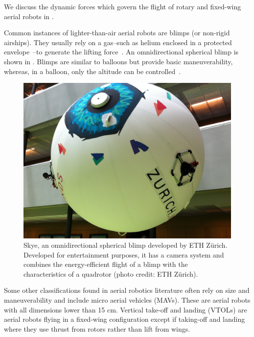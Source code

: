 We discuss the dynamic forces which govern the flight of rotary and fixed-wing aerial robots in .

Common instances of lighter-than-air aerial robots are blimps (or non-rigid airships). They usually rely on a gas--such as helium enclosed in a protected envelope~\citep{burri2013design}--to generate the lifting force~\citep{fui2017recent}. An omnidirectional spherical blimp is shown in . Blimps are similar to balloons but provide basic maneuverability, whereas, in a balloon, only the altitude can be controlled~\citep{colombatti2011lighter}.

\begin{figure}[h]
  \centering
  \includegraphics[width=.7\textwidth]{pictures/IMG_2612}
  \caption[Skye, an omnidirectional spherical blimp]{Skye, an omnidirectional spherical blimp developed by ETH Z\"urich. Developed for entertainment purposes, it has a camera system and combines the energy-efficient flight of a blimp with the characteristics of a quadrotor {\scriptsize(photo credit: ETH Z\"urich)}.}   
  \label{fig:skye-blimp}
\end{figure}

Some other classifications found in aerial robotics literature often rely on size and maneuverability and include micro aerial vehicles (MAVs). These are aerial robots with all dimensions lower than 15 cm. Vertical take-off and landing (VTOLs) are aerial robots flying in a fixed-wing configuration except if taking-off and landing where they use thrust from rotors rather than lift from wings. 

